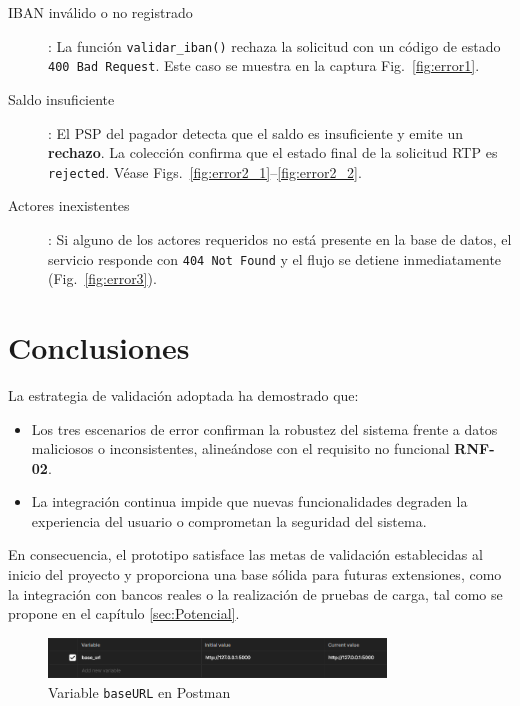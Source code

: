 \begin{description}
  \item[IBAN inválido o no registrado]: La función \texttt{validar\_iban()} rechaza la solicitud con un código de estado \texttt{400 Bad Request}. Este caso se muestra en la captura Fig.~\ref{fig:error1}.
  
  \item[Saldo insuficiente]: El PSP del pagador detecta que el saldo es insuficiente y emite un \textbf{rechazo}. La colección confirma que el estado final de la solicitud RTP es \texttt{rejected}. Véase Figs.~\ref{fig:error2_1}–\ref{fig:error2_2}.
  
  \item[Actores inexistentes]: Si alguno de los actores requeridos no está presente en la base de datos, el servicio responde con \texttt{404 Not Found} y el flujo se detiene inmediatamente (Fig.~\ref{fig:error3}).
\end{description}

\section{Conclusiones}

La estrategia de validación adoptada ha demostrado que:

\begin{itemize}
  \item Los tres escenarios de error confirman la robustez del sistema frente a datos maliciosos o inconsistentes, alineándose con el requisito no funcional \textbf{RNF-02}.
  \item La integración continua impide que nuevas funcionalidades degraden la experiencia del usuario o comprometan la seguridad del sistema.
\end{itemize}

En consecuencia, el prototipo satisface las metas de validación establecidas al inicio del proyecto y proporciona una base sólida para futuras extensiones, como la integración con bancos reales o la realización de pruebas de carga, tal como se propone en el capítulo \ref{sec:Potencial}.



\begin{figure}[H]
  \centering
  \includegraphics[width=0.8\textwidth]{Imagenes/baseURL.png}
  \caption{Variable \texttt{baseURL} en Postman}
  \label{fig:baseURL}
\end{figure}


